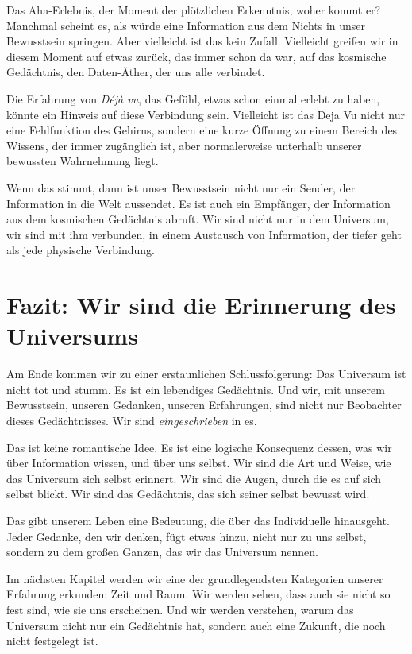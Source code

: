 Das \glqq Aha-Erlebnis\grqq{}, der Moment der plötzlichen Erkenntnis, woher kommt er? Manchmal scheint es, als würde eine Information aus dem Nichts in unser Bewusstsein springen. Aber vielleicht ist das kein Zufall. Vielleicht greifen wir in diesem Moment auf etwas zurück, das immer schon da war, auf das kosmische Gedächtnis, den Daten-Äther, der uns alle verbindet.

Die Erfahrung von \emph{Déjà vu}, das Gefühl, etwas schon einmal erlebt zu haben, könnte ein Hinweis auf diese Verbindung sein. Vielleicht ist das Deja Vu nicht nur eine Fehlfunktion des Gehirns, sondern eine kurze Öffnung zu einem Bereich des Wissens, der immer zugänglich ist, aber normalerweise unterhalb unserer bewussten Wahrnehmung liegt.

Wenn das stimmt, dann ist unser Bewusstsein nicht nur ein Sender, der Information in die Welt aussendet. Es ist auch ein Empfänger, der Information aus dem kosmischen Gedächtnis abruft. Wir sind nicht nur \glqq in\grqq{} dem Universum, wir sind \glqq mit\grqq{} ihm verbunden, in einem Austausch von Information, der tiefer geht als jede physische Verbindung.

\section{Fazit: Wir sind die Erinnerung des Universums}

Am Ende kommen wir zu einer erstaunlichen Schlussfolgerung: Das Universum ist nicht tot und stumm. Es ist ein lebendiges Gedächtnis. Und wir, mit unserem Bewusstsein, unseren Gedanken, unseren Erfahrungen, sind nicht nur Beobachter dieses Gedächtnisses. Wir sind \emph{eingeschrieben} in es.

Das ist keine romantische Idee. Es ist eine logische Konsequenz dessen, was wir über Information wissen, und über uns selbst. Wir sind die Art und Weise, wie das Universum sich selbst erinnert. Wir sind die Augen, durch die es auf sich selbst blickt. Wir sind das Gedächtnis, das sich seiner selbst bewusst wird.

Das gibt unserem Leben eine Bedeutung, die über das Individuelle hinausgeht. Jeder Gedanke, den wir denken, fügt etwas hinzu, nicht nur zu uns selbst, sondern zu dem großen Ganzen, das wir das Universum nennen.

Im nächsten Kapitel werden wir eine der grundlegendsten Kategorien unserer Erfahrung erkunden: Zeit und Raum. Wir werden sehen, dass auch sie nicht so fest sind, wie sie uns erscheinen. Und wir werden verstehen, warum das Universum nicht nur ein Gedächtnis hat, sondern auch eine Zukunft, die noch nicht festgelegt ist.

